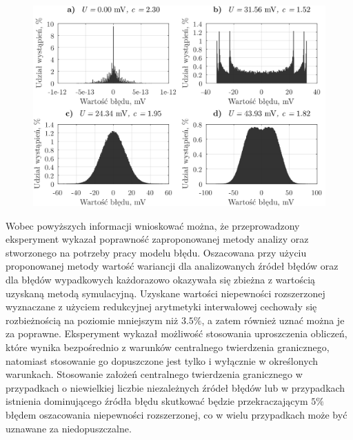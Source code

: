 \begin{figure}[htb!]
\begin{center}
\includegraphics{obrazki/hist_part_T}
\end{center}
\end{figure}

Wobec powyższych informacji wnioskować można, że przeprowadzony eksperyment wykazał poprawność zaproponowanej metody analizy oraz stworzonego na potrzeby pracy modelu błędu. Oszacowana przy użyciu proponowanej metody wartość wariancji dla analizowanych źródeł błędów oraz dla błędów wypadkowych każdorazowo okazywała się zbieżna z wartością uzyskaną metodą symulacyjną. Uzyskane wartości niepewności rozszerzonej wyznaczane z użyciem redukcyjnej arytmetyki interwałowej cechowały się rozbieżnością na poziomie mniejszym niż $3.5\%$, a zatem również uznać można je za poprawne. Eksperyment wykazał możliwość stosowania uproszczenia obliczeń, które wynika bezpośrednio z warunków centralnego twierdzenia granicznego, natomiast stosowanie go dopuszczone jest tylko i wyłącznie w określonych warunkach. Stosowanie założeń centralnego twierdzenia granicznego w przypadkach o niewielkiej liczbie niezależnych źródeł błędów lub w przypadkach istnienia dominującego źródła błędu skutkować będzie przekraczającym $5\%$ błędem oszacowania niepewności rozszerzonej, co w wielu przypadkach może być uznawane za niedopuszczalne.

